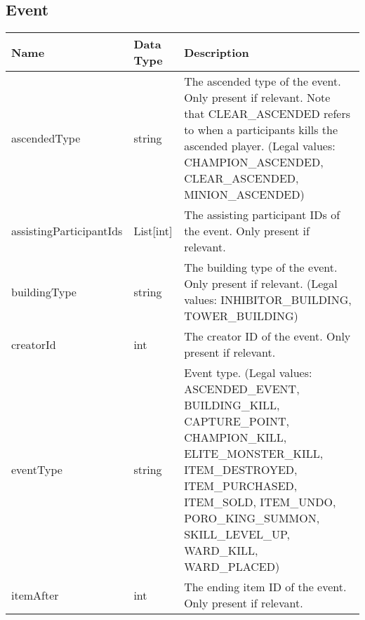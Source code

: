 \subsection{Event}
\begin{table}[!htb]
\tiny
\centering
\begin{tabular}{|llp{5cm}|}
\hline
\textbf{Name}           & \textbf{Data Type} & \textbf{Description}                                                                                                                                                                                                                        \\ \hline
ascendedType            & string             & The ascended type of the event. Only present if relevant. Note that CLEAR\_ASCENDED refers to when a participants kills the ascended player. (Legal values: CHAMPION\_ASCENDED, CLEAR\_ASCENDED, MINION\_ASCENDED)                          \\ \hline
assistingParticipantIds & List{[}int{]}      & The assisting participant IDs of the event. Only present if relevant.                                                                                                                                                                       \\ \hline
buildingType            & string             & The building type of the event. Only present if relevant. (Legal values: INHIBITOR\_BUILDING, TOWER\_BUILDING)                                                                                                                              \\ \hline
creatorId               & int                & The creator ID of the event. Only present if relevant.                                                                                                                                                                                      \\ \hline
eventType               & string             & Event type. (Legal values: ASCENDED\_EVENT, BUILDING\_KILL, CAPTURE\_POINT, CHAMPION\_KILL, ELITE\_MONSTER\_KILL, ITEM\_DESTROYED, ITEM\_PURCHASED, ITEM\_SOLD, ITEM\_UNDO, PORO\_KING\_SUMMON, SKILL\_LEVEL\_UP, WARD\_KILL, WARD\_PLACED) \\ \hline
itemAfter               & int                & The ending item ID of the event. Only present if relevant.                                                                                                                                                                                  \\ \hline

\end{tabular}
\end{table}
